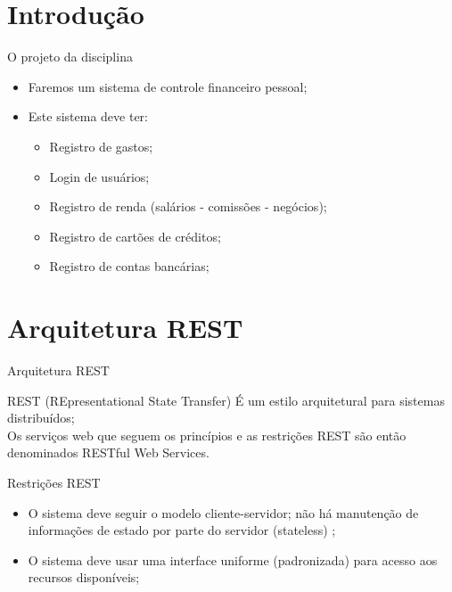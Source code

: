 \documentclass{beamer}
\begin{document}
\section{Introdução}
\begin{frame}[label=proof]{O projeto da disciplina}
	\begin{itemize}
	\item Faremos um sistema de controle financeiro pessoal;
	\item Este sistema deve ter:
	\begin{itemize}
	\item Registro de gastos;
	\item Login de usuários;
	\item Registro de renda (salários - comissões - negócios);
	\item Registro de cartões de créditos;
	\item Registro de contas bancárias;
	\end{itemize}
	\end{itemize}
    \end{frame}
\section{Arquitetura REST}
\begin{frame}{Arquitetura REST}
    \begin{exampleblock}{REST (REpresentational State Transfer)}
        É um estilo arquitetural para sistemas distribuídos; \\
        Os serviços web que seguem os princípios e as restrições REST são então denominados RESTful Web Services.
    \end{exampleblock}
    
    \begin{exampleblock}{Restrições REST}
    \begin{itemize}
        \item O sistema deve seguir o modelo cliente-servidor; não há manutenção de informações de estado por parte do servidor (stateless) \cite{tanembaum2007sd};
        \item O sistema deve usar uma interface uniforme (padronizada) para acesso aos recursos disponíveis;
    \end{itemize}
        
    \end{exampleblock}
\end{frame}
\end{document}
